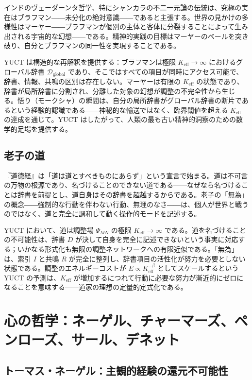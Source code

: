\documentclass[12pt,a4paper]{article}
\begin{document}
	インドのヴェーダーンタ哲学、特にシャンカラの不二一元論の伝統は、究極の実在はブラフマン――未分化の絶対意識――であると主張する。世界の見かけの多様性はマーヤー――ブラフマンが個別の主体と客体に分裂することによって生み出される宇宙的な幻想――である。精神的実践の目標はマーヤーのベールを突き破り、自分とブラフマンの同一性を実現することである。
	
	YUCT は構造的な再解釈を提供する：ブラフマンは極限 \(K_{\mathrm{eff}} \to \infty\) におけるグローバル辞書 \(\mathcal{D}_{\text{global}}\) であり、そこではすべての項目が同時にアクセス可能で、辞書、情報、共鳴の区別は存在しない。マーヤーは有限の \(K_{\mathrm{eff}}\) の状態であり、辞書が局所辞書に分割され、分離した対象の幻想が調整の不完全性から生じる。悟り（モークシャ）の瞬間は、自分の局所辞書がグローバル辞書の断片であるという経験的認識である――神秘的な輸送ではなく、臨界閾値を超える \(K_{\mathrm{eff}}\) の達成を通じて。YUCT はしたがって、人類の最も古い精神的洞察のための数学的足場を提供する。
	
	\subsection{老子の道}
	
	『道徳経』は「道は道とすべきものにあらず」という宣言で始まる。道は不可言の万物の根源であり、名づけることのできない道である――なぜなら名づけることは辞書を前提とし、道自身はその辞書を超越するからである。老子の「無為」の概念――強制的な行動を伴わない行動、無理のなさ――は、個人が世界と戦うのではなく、道と完全に調和して動く操作的モードを記述する。
	
	YUCT において、道は調整場 \(\Psi_{MN}\) の極限 \(K_{\mathrm{eff}} \to \infty\) である。道を名づけることの不可能性は、辞書 \(D\) が決して自身を完全に記述できないという事実に対応する；いかなる形式化も無限の調整ネットワークへの有限近似である。「無為」は、索引 \(I\) と共鳴 \(R\) が完全に整列し、辞書項目の活性化が努力を必要としない状態である。調整のエネルギーコストが \(E \propto K_{\mathrm{eff}}^{-\beta}\) としてスケールするという YUCT の予測は、\(K_{\mathrm{eff}}\) が増加するにつれて行動に必要な努力が漸近的にゼロになることを意味する――道家の理想の定量的定式化である。
	
	\section{心の哲学：ネーゲル、チャーマーズ、ペンローズ、サール、デネット}
	
	\subsection{トーマス・ネーゲル：主観的経験の還元不可能性}
	
\end{document}
